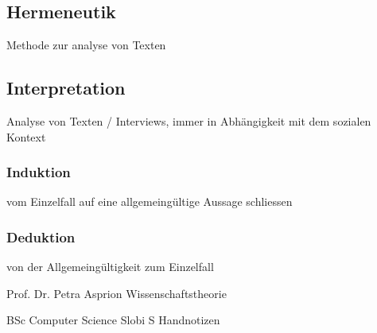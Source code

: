 \documentclass[DIV=calc, paper=a4, fontsize=11pt, twocolumn]{scrartcl}	 %
\begin{document}
\subsection*{Hermeneutik}
Methode zur analyse von Texten

\subsection*{Interpretation}
Analyse von Texten / Interviews, immer in Abhängigkeit mit dem sozialen Kontext

\subsubsection*{Induktion}
vom Einzelfall auf eine allgemeingültige Aussage schliessen

\subsubsection*{Deduktion}
von der Allgemeingültigkeit zum Einzelfall

\begin{thebibliography}{99} %

Prof. Dr. Petra Asprion
\newblock Wissenschaftstheorie
 
BSc Computer Science Slobi S
\newblock Handnotizen
 
\end{thebibliography}

\end{document}
